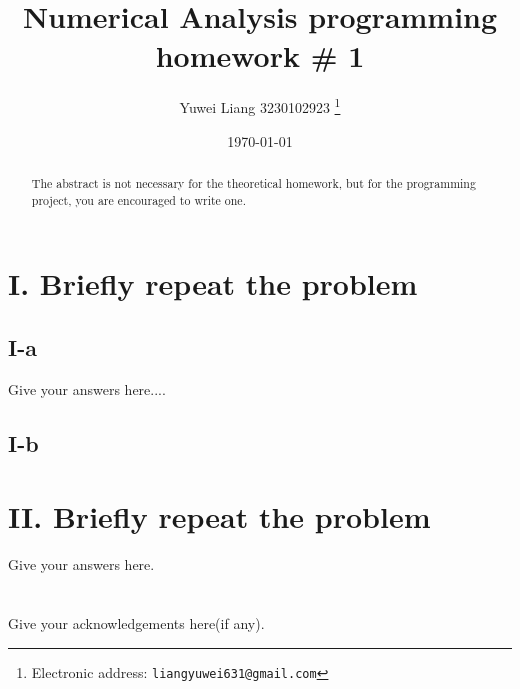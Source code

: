 \documentclass[a4paper]{article}
\begin{document}
\title{Numerical Analysis  programming homework \# 1}

\author{Yuwei Liang 3230102923
  \thanks{Electronic address: \texttt{liangyuwei631@gmail.com}}}


\date{\today}

\maketitle

\begin{abstract}
  The abstract is not necessary for the theoretical homework,
  but for the programming project,
  you are encouraged to write one.
\end{abstract}





\section*{I. Briefly repeat the problem}

\subsection*{I-a}

Give your answers here....

\subsection*{I-b}

\section*{II. Briefly repeat the problem}

Give your answers here.





\section*{  }
Give your acknowledgements here(if any).
\end{document}
